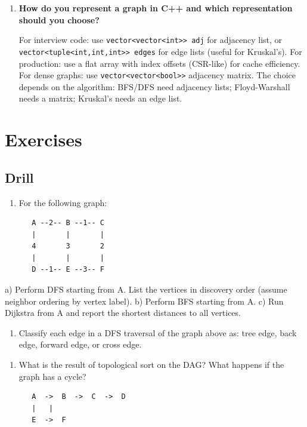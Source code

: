 \begin{enumerate}
\item \textbf{How do you represent a graph in C++ and which representation should you choose?}

For interview code: use \texttt{vector<vector<int>> adj} for adjacency list, or \texttt{vector<tuple<int,int,int>> edges} for edge lists (useful for Kruskal's). For production: use a flat array with index offsets (CSR-like) for cache efficiency. For dense graphs: use \texttt{vector<vector<bool>>} adjacency matrix. The choice depends on the algorithm: BFS/DFS need adjacency lists; Floyd-Warshall needs a matrix; Kruskal's needs an edge list.
\end{enumerate}

\section{Exercises}

\subsection{Drill}

\begin{enumerate}
\item For the following graph:
\begin{lstlisting}
   A --2-- B --1-- C
   |       |       |
   4       3       2
   |       |       |
   D --1-- E --3-- F
\end{lstlisting}
\end{enumerate}
   a) Perform DFS starting from A. List the vertices in discovery order (assume neighbor ordering by vertex label).
   b) Perform BFS starting from A.
   c) Run Dijkstra from A and report the shortest distances to all vertices.

\begin{enumerate}
\item Classify each edge in a DFS traversal of the graph above as: tree edge, back edge, forward edge, or cross edge.
\end{enumerate}

\begin{enumerate}
\item What is the result of topological sort on the DAG? What happens if the graph has a cycle?
\begin{lstlisting}
   A  ->  B  ->  C  ->  D
   |   |
   E  ->  F
\end{lstlisting}
\end{enumerate}

